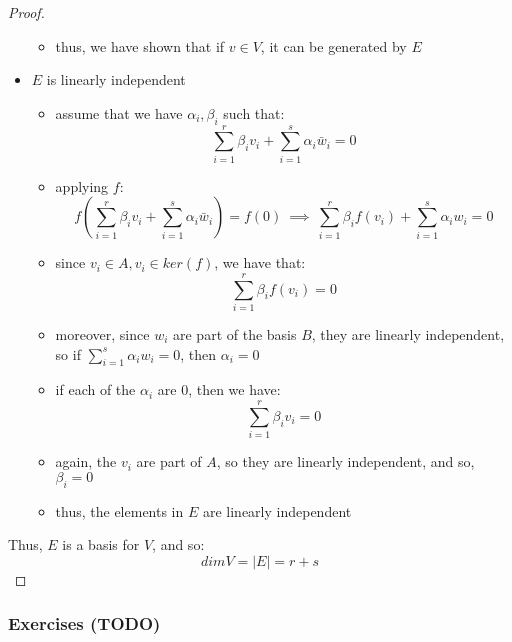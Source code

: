\documentclass{exam}
\begin{document}
\begin{proof}
\begin{itemize}
\begin{itemize}
        \item thus, we have shown that if $v \in V$, it can be generated by $E$
    \end{itemize}
    \item $E$ is linearly independent
    \begin{itemize}
        \item assume that we have $\alpha_i, \beta_i$ such that:
        \[
        \sum_{i = 1}^r \beta_i v_i + \sum_{i = 1}^s \alpha_i \bar{w}_i = 0
        \]
        \item applying $f$:
        \[
        f\left(\sum_{i = 1}^r \beta_i v_i + \sum_{i = 1}^s \alpha_i \bar{w}_i\right) = f(0) \ \implies \ \sum_{i = 1}^r \beta_i f(v_i) + \sum_{i = 1}^s \alpha_i w_i = 0
        \]
        \item since $v_i \in A, v_i \in ker(f)$, we have that:
        \[
        \sum_{i = 1}^r \beta_i f(v_i) = 0
        \]
        \item moreover, since $w_i$ are part of the basis $B$, they are linearly independent, so if $\sum_{i = 1}^s \alpha_i w_i = 0$, then $\alpha_i = 0$
        \item if each of the $\alpha_i$ are 0, then we have:
        \[
        \sum_{i = 1}^r \beta_i v_i  = 0
        \]
        \item again, the $v_i$ are part of $A$, so they are linearly independent, and so, $\beta_i = 0$
        \item thus, the elements in $E$ are linearly independent
    \end{itemize}
\end{itemize}

Thus, $E$ is a basis for $V$, and so:
\[
dim V = |E| = r + s
\]

\end{proof}

\subsubsection{Exercises (TODO)}
\end{document}
